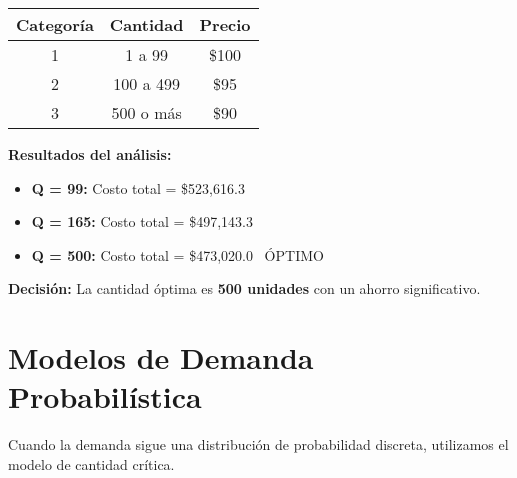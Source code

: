 \documentclass[12pt,a4paper]{book}
\begin{document}
	\begin{tcolorbox}[enhanced,colback=grisclaro,colframe=grisoScuro,boxrule=2pt,arc=8pt,
		title={\bfseries\color{white} \faTable\ ESTRUCTURA DE DESCUENTOS}]
		
		\begin{center}
			\begin{tabular}{|c|c|c|}
				\hline
				\rowcolor{azulclaro}
				\textbf{Categoría} & \textbf{Cantidad} & \textbf{Precio} \\
				\hline
				1 & 1 a 99 & \textcolor{rojoacento}{\$100} \\
				\hline
				2 & 100 a 499 & \textcolor{naranjaacento}{\$95} \\
				\hline
				3 & 500 o más & \textcolor{verdeprincipal}{\$90} \\
				\hline
			\end{tabular}
		\end{center}
		
	\end{tcolorbox}
	
	\begin{tcolorbox}[enhanced,colback=verdeclaro,colframe=verdeprincipal,boxrule=2pt,arc=8pt,
		title={\bfseries\color{white} \faCalculator\ ANÁLISIS DE COSTOS}]
		
		\textbf{Resultados del análisis:}
		
		\begin{itemize}[leftmargin=*,label=\textcolor{azulprincipal}{\faCheckCircle}]
			\item \textbf{Q = 99:} Costo total = \textcolor{rojoacento}{\$523,616.3}
			\item \textbf{Q = 165:} Costo total = \textcolor{naranjaacento}{\$497,143.3}  
			\item \textbf{Q = 500:} Costo total = \textcolor{verdeprincipal}{\$473,020.0} \faArrowLeft\ ÓPTIMO
		\end{itemize}
		
		\textbf{Decisión:} La cantidad óptima es \textbf{500 unidades} con un ahorro significativo.
		
	\end{tcolorbox}
	
	\section{Modelos de Demanda Probabilística}
	
	\begin{tcolorbox}[enhanced,colback=naranjaclaro,colframe=naranjaacento,boxrule=3pt,arc=12pt,
		drop shadow,title={\Large\bfseries\color{white} \faChartLine\ MODELO DE DEMANDA DISCRETA}]
		
		Cuando la demanda sigue una distribución de probabilidad discreta, utilizamos el modelo de cantidad crítica.
		
	\end{tcolorbox}
	
\end{document}
